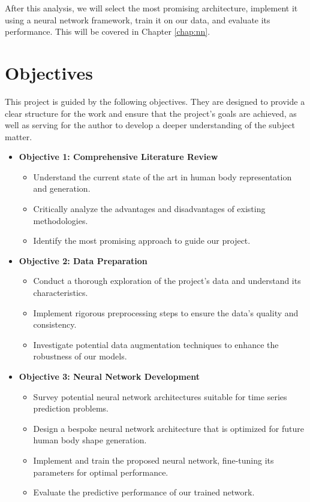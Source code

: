 After this analysis, we will select the most promising architecture, implement
it using a neural network framework, train it on our data, and evaluate its
performance. This will be covered in Chapter \ref{chap:nn}.

\section{Objectives}\label{objectives}

This project is guided by the following objectives. They are designed to
provide a clear structure for the work and ensure that the project's goals are
achieved, as well as serving for the author to develop a deeper understanding
of the subject matter.

\begin{itemize}
	\item \textbf{Objective 1: Comprehensive Literature Review}
	      \begin{itemize}
		      \item Understand the current state of the art in human body representation and
		            generation.
		      \item Critically analyze the advantages and disadvantages of existing methodologies.
		      \item Identify the most promising approach to guide our project.
	      \end{itemize}

	\item \textbf{Objective 2: Data Preparation}
	      \begin{itemize}
		      \item Conduct a thorough exploration of the project's data and understand its
		            characteristics.
		      \item Implement rigorous preprocessing steps to ensure the data's quality and
		            consistency.
		      \item Investigate potential data augmentation techniques to enhance the robustness of
		            our models.
	      \end{itemize}

	\item \textbf{Objective 3: Neural Network Development}
	      \begin{itemize}
		      \item Survey potential neural network architectures suitable for time series
		            prediction problems.
		      \item Design a bespoke neural network architecture that is optimized for future human
		            body shape generation.
		      \item Implement and train the proposed neural network, fine-tuning its parameters for
		            optimal performance.
		      \item Evaluate the predictive performance of our trained network.
	      \end{itemize}


\end{itemize}
